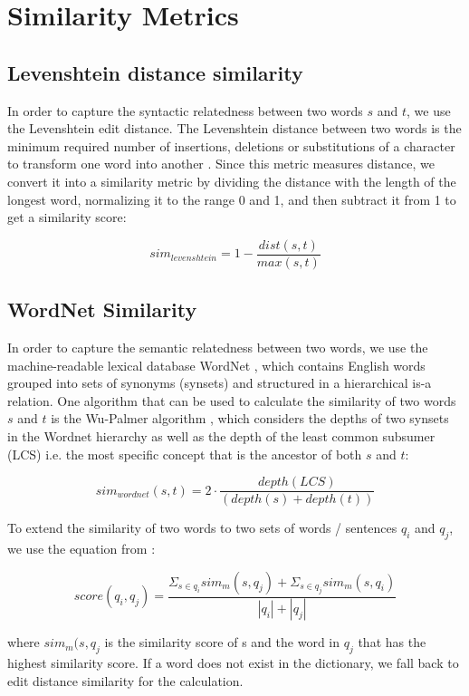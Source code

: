 \section{Similarity Metrics}

\subsection{Levenshtein distance similarity}

In order to capture the syntactic relatedness between two words \(s\) and \(t\), we use the Levenshtein edit distance. The Levenshtein distance between two words is the minimum required number of insertions, deletions or substitutions of a character to transform one word into another \cite{levenshtein}. Since this metric measures distance, we convert it into a similarity metric by dividing the distance with the length of the longest word, normalizing it to the range 0 and 1, and then subtract it from 1 to get a similarity score:

\[sim_{levenshtein} = 1 - \frac{dist(s, t)}{max(s, t)}\]

\subsection{WordNet Similarity}\label{wordnet}

In order to capture the semantic relatedness between two words, we use the machine-readable lexical database WordNet \cite{wordnet}, which contains English words grouped into sets of synonyms (synsets) and structured in a hierarchical is-a relation. One algorithm that can be used to calculate the similarity of two words \(s\) and \(t\) is the Wu-Palmer algorithm \cite{wuPalmer}, which considers the depths of two synsets in the Wordnet hierarchy as well as the depth of the least common subsumer (LCS) i.e. the most specific concept that is the ancestor of both \(s\) and \(t\):

\[sim_{wordnet}(s, t) = 2 \cdot \frac{depth(LCS)}{(depth(s) + depth(t))}\]

To extend the similarity of two words to two sets of words / sentences \(q_i\) and \(q_j\), we use the equation from \cite{wordnetSim}:

\[score(q_i, q_j) = \frac{\Sigma_{s \in q_i} sim_m(s, q_j) +\Sigma_{s \in q_j} sim_m(s, q_i)}{|q_i| + |q_j|}\]

where \(sim_m(s, q_j\) is the similarity score of s and the word in \(q_j\) that has the highest similarity score. If a word does not exist in the dictionary, we fall back to edit distance similarity for the calculation.

